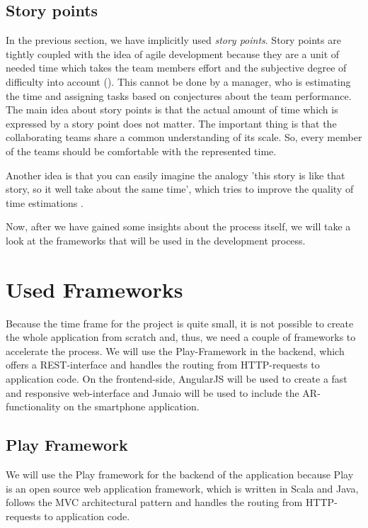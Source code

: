 \subsection{Story points}
\label{storyPoints}
In the previous section, we have implicitly used \emph{story points}. Story points are tightly coupled with the idea of agile development because they are a unit of needed time which takes the team members effort and the subjective degree of difficulty into account (\cite{ScrumMeth}). This cannot be done by a manager, who is estimating the time and assigning tasks based on conjectures about the team performance. The main idea about story points is that the actual amount of time which is expressed by a story point does not matter. The important thing is that the collaborating teams share a common understanding of its scale. So,  every member of the teams should be comfortable with the represented time. 

Another idea is that you can easily imagine the analogy 'this story is like that story, so it well take about the same time', which tries to improve the quality of time estimations \cite{cohn2004user}.

Now, after we have gained some insights about the process itself, we will take a look at the frameworks that will be used in the development process.

\section{Used Frameworks}
Because the time frame for the project is quite small, it is not possible to create the whole application from scratch and, thus, we need a couple of frameworks to accelerate the process. We will use the Play-Framework in the backend, which offers a \ac{REST}-interface and handles the routing from \ac{HTTP}-requests to application code. On the frontend-side, AngularJS will be used to create a fast and responsive web-interface and Junaio will be used to include the \ac{AR}-functionality on the smartphone application.

\subsection{Play Framework}	
\label{Play2}
We will use the Play framework for the backend of the application because Play is an open source web application framework, which is written in Scala and Java, follows the \ac{MVC} architectural pattern and handles the routing from \ac{HTTP}-requests to application code. 

